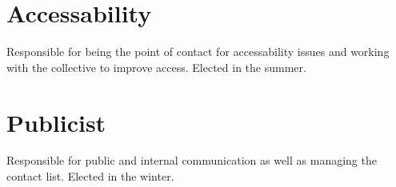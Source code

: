 \section{Accessability}\label{sec:accessability}
Responsible for being the point of contact for accessability issues and working with the collective to improve access. Elected in the summer.
\section{Publicist}\label{sec:publicist}
Responsible for public and internal communication as well as managing the contact list. Elected in the winter.

